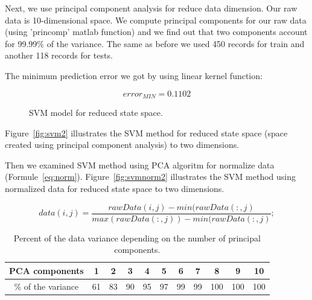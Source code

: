 \documentclass[
10pt, %
a4paper, %
oneside, %
headinclude,footinclude, %
BCOR5mm, %
]{scrartcl}
\begin{document}
Next, we use principal component analysis for reduce data dimension. Our raw data is 10-dimensional space. We compute principal components for our raw data (using 'princomp' matlab function) and we find out that two components account for 99.99$ \% $ of the variance. The same as before we used 450 records for train and another 118 records for tests.

The minimum prediction error we got by using linear kernel function:

\begin{equation}
 error_{MIN} = 0.1102
\label{eq:refname2}
\end{equation}

\begin{figure}[H]
\centering 
{}%
\caption[An example of a floating figure]{SVM model for reduced state space.} %
\label{fig:svm2} 
\end{figure}

Figure~\vref{fig:svm2} illustrates the SVM method for reduced state space (space created using principal component analysis) to two dimensions.

Then we examined SVM method using PCA algoritm for normalize data (Formule~\vref{eq:norm}). Figure~\vref{fig:svmnorm2} illustrates the SVM method using normalized data for reduced state space to two dimensions.

\begin{equation} 
 data(i,j) = \frac{rawData(i,j) - min(rawData(:,j)}{max(rawData(:,j)) - min(rawData(:,j)};
\label{eq:norm}
\end{equation}

\begin{table}[H]
	\centering
	\begin{tabular}{ c | c | c | c | c | c | c | c | c | c | c}
    PCA components  & 1 & 2 & 3 & 4 & 5 & 6 & 7 & 8 & 9 & 10 \\ \hline
    $ \% $ of the variance & 61 & 83 & 90 & 95 & 97 & 99 & 99 & 100 & 100 & 100 \\
  	\end{tabular}
  	\caption{Percent of the data variance depending on the number of principal components.}
  	\label{tab2}
\end{table}
\end{document}
